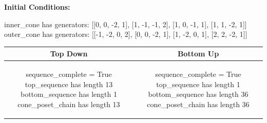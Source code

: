 \documentclass[10pt]{article}
\begin{document}
\textbf{Initial Conditions:}
\begin{SAGE}
inner_cone has generators: 
[[0, 0, -2, 1], [1, -1, -1, 2], [1, 0, -1, 1], [1, 1, -2, 1]]
outer_cone has generators: 
[[-1, -2, 0, 2], [0, 0, -2, 1], [1, -2, 0, 1], [2, 2, -2, 1]]

\end{SAGE}
\begin{tabular}{c|c}
\textbf{Top Down} & \textbf{Bottom Up} \\ \hline  
\begin{SAGE}
sequence_complete = True
top_sequence has length 13
bottom_sequence has length 1
cone_poset_chain has length 13
\end{SAGE} 
&
\begin{SAGE}
sequence_complete = True
top_sequence has length 1
bottom_sequence has length 36
cone_poset_chain has length 36
\end{SAGE} 
\\ \hline


\end{tabular}
\end{document}
